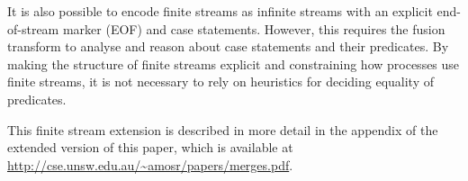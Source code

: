 It is also possible to encode finite streams as infinite streams with an explicit end-of-stream marker (EOF) and case statements. However, this requires the fusion transform to analyse and reason about case statements and their predicates.
By making the structure of finite streams explicit and constraining how processes use finite streams, it is not necessary to rely on heuristics for deciding equality of predicates.

This finite stream extension is described in more detail in the appendix of the extended version of this paper, which is available at \url{http://cse.unsw.edu.au/~amosr/papers/merges.pdf}.

